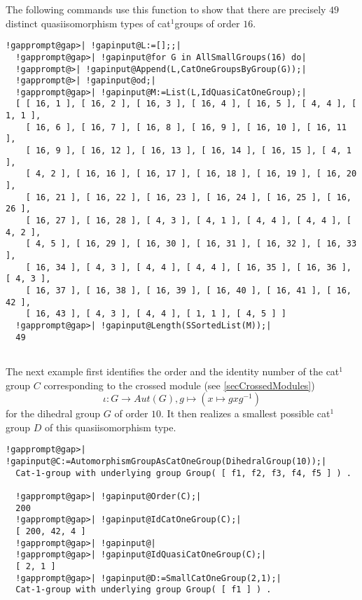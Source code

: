 \documentclass[a4paper,11pt]{report}
\begin{document}
{{The following commands use this function to show that there are precisely $49$ distinct quasi\texttt{}isomorphism types of cat$^1$\texttt{}groups of order $16$. 
\begin{Verbatim}[commandchars=!@|,fontsize=\small,frame=single,label=Example]
  !gapprompt@gap>| !gapinput@L:=[];;|
  !gapprompt@gap>| !gapinput@for G in AllSmallGroups(16) do|
  !gapprompt@>| !gapinput@Append(L,CatOneGroupsByGroup(G));|
  !gapprompt@>| !gapinput@od;|
  !gapprompt@gap>| !gapinput@M:=List(L,IdQuasiCatOneGroup);|
  [ [ 16, 1 ], [ 16, 2 ], [ 16, 3 ], [ 16, 4 ], [ 16, 5 ], [ 4, 4 ], [ 1, 1 ], 
    [ 16, 6 ], [ 16, 7 ], [ 16, 8 ], [ 16, 9 ], [ 16, 10 ], [ 16, 11 ], 
    [ 16, 9 ], [ 16, 12 ], [ 16, 13 ], [ 16, 14 ], [ 16, 15 ], [ 4, 1 ], 
    [ 4, 2 ], [ 16, 16 ], [ 16, 17 ], [ 16, 18 ], [ 16, 19 ], [ 16, 20 ], 
    [ 16, 21 ], [ 16, 22 ], [ 16, 23 ], [ 16, 24 ], [ 16, 25 ], [ 16, 26 ], 
    [ 16, 27 ], [ 16, 28 ], [ 4, 3 ], [ 4, 1 ], [ 4, 4 ], [ 4, 4 ], [ 4, 2 ], 
    [ 4, 5 ], [ 16, 29 ], [ 16, 30 ], [ 16, 31 ], [ 16, 32 ], [ 16, 33 ], 
    [ 16, 34 ], [ 4, 3 ], [ 4, 4 ], [ 4, 4 ], [ 16, 35 ], [ 16, 36 ], [ 4, 3 ], 
    [ 16, 37 ], [ 16, 38 ], [ 16, 39 ], [ 16, 40 ], [ 16, 41 ], [ 16, 42 ], 
    [ 16, 43 ], [ 4, 3 ], [ 4, 4 ], [ 1, 1 ], [ 4, 5 ] ]
  !gapprompt@gap>| !gapinput@Length(SSortedList(M));|
  49
  
\end{Verbatim}
 The next example first identifies the order and the identity number of the cat$^1$\texttt{}group $C$ corresponding to the crossed module (see \ref{secCrossedModules}) 
\[\iota\colon G \longrightarrow Aut(G), g \mapsto (x\mapsto gxg^{-1})\]
 for the dihedral group $G$ of order $10$. It then realizes a smallest possible cat$^1$\texttt{}group $D$ of this quasi\texttt{}isomorphism type. 
\begin{Verbatim}[commandchars=!@|,fontsize=\small,frame=single,label=Example]
  !gapprompt@gap>| !gapinput@C:=AutomorphismGroupAsCatOneGroup(DihedralGroup(10));|
  Cat-1-group with underlying group Group( [ f1, f2, f3, f4, f5 ] ) . 
  
  !gapprompt@gap>| !gapinput@Order(C);|
  200
  !gapprompt@gap>| !gapinput@IdCatOneGroup(C);|
  [ 200, 42, 4 ]
  !gapprompt@gap>| !gapinput@|
  !gapprompt@gap>| !gapinput@IdQuasiCatOneGroup(C);|
  [ 2, 1 ]
  !gapprompt@gap>| !gapinput@D:=SmallCatOneGroup(2,1);|
  Cat-1-group with underlying group Group( [ f1 ] ) . 
  
\end{Verbatim}
 }

}
\end{document}
